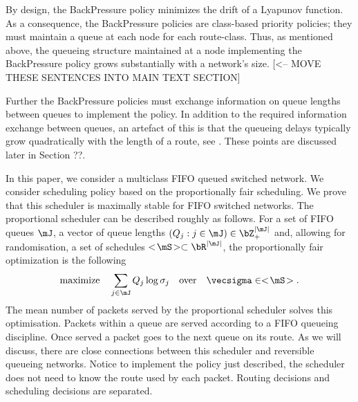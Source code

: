 \documentclass{amsart}
\begin{document}
By design, the BackPressure policy minimizes the drift of a Lyapunov function.
As a consequence, the BackPressure policies are class-based priority policies; they must maintain a queue at each node for each route-class. Thus, as mentioned above, the queueing structure maintained at a node implementing the BackPressure policy grows substantially with a network's size. 
[<-- MOVE THESE SENTENCES INTO MAIN TEXT SECTION]

Further the BackPressure policies must exchange information on queue lengths between queues to implement the policy.  In addition to the required information exchange between queues, an artefact of this is that the queueing delays typically grow quadratically with the length of a route, see \cite{BSS11}. These points are discussed later in Section ??.

In this paper, we consider a multiclass FIFO queued switched network.  We consider scheduling policy based on the proportionally fair scheduling. We prove that this scheduler is maximally stable for FIFO switched networks.  The proportional scheduler can be described roughly as follows. For a set of FIFO queues $\mJ$, a vector of queue lengths $(Q_j: j\in\mJ)\in \bZ_+^{|\mJ|}$ and, allowing for randomisation, a set of schedules $ <\!\mS \!> \subset \bR^{|\mJ|}$, the proportionally fair optimization is the following
\begin{align}\label{IntroPF}
&\text{maximize}&&\sum_{j\in\mJ} Q_j \log \sigma_j
&\text{over} &&  \vecsigma \in <\! \mS \! >.
\end{align}
The mean number of packets served by the proportional scheduler solves this optimisation.  Packets within a queue are served according to a FIFO queueing discipline. Once served a packet goes to the next queue on its route.
As we will discuss, there are close connections between this scheduler and reversible queueing networks.
Notice to implement the policy just described, the scheduler does not need to know the route used by each packet. Routing decisions and scheduling decisions are separated.
\end{document}
